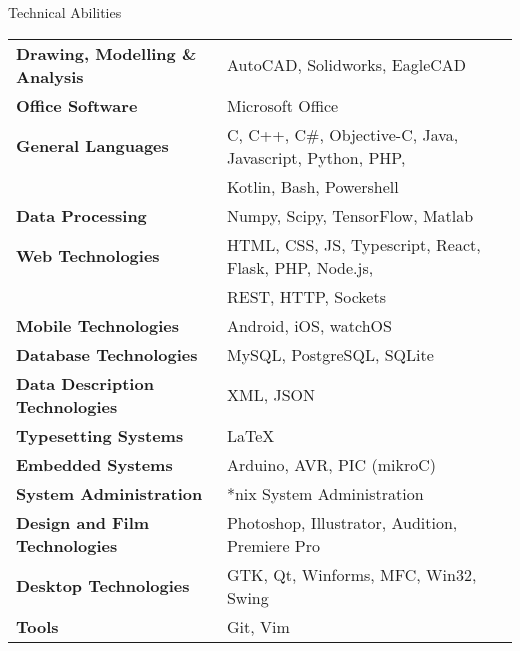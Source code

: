 \documentclass{resume}
\begin{document}
\begin{rSection}{Technical Abilities}

\begin{tabular}{ @{} >{\bfseries}l @{\hspace{6ex}} l }
Drawing, Modelling \& Analysis 	& AutoCAD, Solidworks, EagleCAD \\
Office Software 			& Microsoft Office \\
General Languages			& C, C++, C\#, Objective-C, Java, Javascript, Python, PHP, \\
					& Kotlin, Bash, Powershell \\
Data Processing			& Numpy, Scipy, TensorFlow, Matlab \\
Web Technologies 			&  HTML, CSS, JS, Typescript, React, Flask, PHP, Node.js,\\
					& REST, HTTP, Sockets \\
Mobile Technologies 		& Android, iOS, watchOS \\
Database Technologies		& MySQL, PostgreSQL, SQLite \\
Data Description Technologies 	& XML, JSON \\
Typesetting Systems 		& \LaTeX \\
Embedded Systems 		& Arduino, AVR, PIC (mikroC) \\
System Administration 		& *nix System Administration \\
Design and Film Technologies 	& Photoshop, Illustrator, Audition, Premiere Pro \\
Desktop Technologies 		& GTK, Qt, Winforms, MFC, Win32, Swing \\
Tools 					& Git, Vim
\end{tabular}

\end{rSection}
\end{document}
